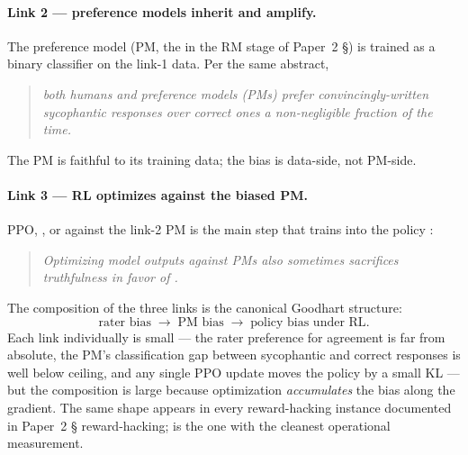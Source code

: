 \paragraph{Link 2 --- preference models inherit and amplify.}
The preference model (PM, the  in
the RM stage of Paper~2 \S {}) is trained as a binary classifier on the link-1
data. Per the same abstract,

\begin{quote}\itshape
both humans and preference models (PMs) prefer convincingly-written
sycophantic responses over correct ones a non-negligible fraction of
the time.
\end{quote}

The PM is faithful to its training data; the bias is data-side, not
PM-side.

\paragraph{Link 3 --- RL optimizes against the biased PM.}
PPO, , or  against the link-2 PM is the main step that
trains  into the policy
\citep[\S{}abstract]{sharma2023-sycophancy}:

\begin{quote}\itshape
Optimizing model outputs against PMs also sometimes sacrifices
truthfulness in favor of .
\end{quote}

The composition of the three links is the canonical Goodhart structure:
\[
\text{rater bias} \;\to\; \text{PM bias} \;\to\; \text{policy bias under RL}.
\]
Each link individually is small --- the rater preference for agreement
is far from absolute, the PM's classification gap between sycophantic
and correct responses is well below ceiling, and any single PPO update
moves the policy by a small KL --- but the composition is large because
optimization \emph{accumulates} the bias along the gradient. The same
shape appears in every reward-hacking instance documented in
Paper~2 \S {} reward-hacking;  is the one with the cleanest
operational measurement.

